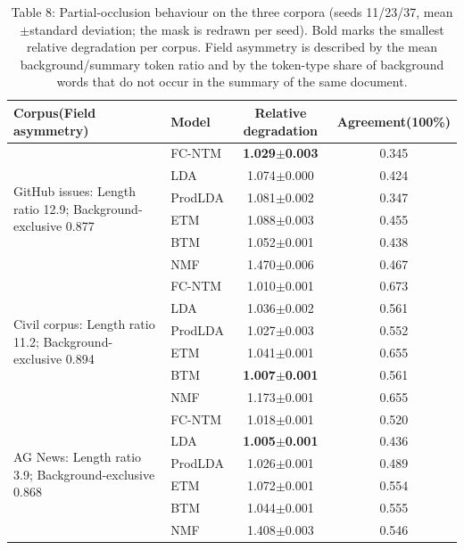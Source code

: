 \documentclass{article}
\begin{document}
\begin{table}[t]
\centering
\caption{Table 8: Partial-occlusion behaviour on the three corpora (seeds 11/23/37, mean$\pm$standard deviation; the mask is redrawn per seed). Bold marks the smallest relative degradation per corpus. Field asymmetry is described by the mean background/summary token ratio and by the token-type share of background words that do not occur in the summary of the same document.}
\label{tab:occl-cross}
\footnotesize
\setlength{\tabcolsep}{3pt}
\begin{tabular}{@{}llcc@{}}
\toprule
Corpus(Field asymmetry) & Model & Relative degradation & Agreement(100\%) \\
\midrule
\multirow{6}{*}{GitHub issues: Length ratio 12.9; Background-exclusive 0.877}
 & FC-NTM & \textbf{1.029$\pm$0.003} & 0.345 \\
 & LDA & 1.074$\pm$0.000 & 0.424 \\
 & ProdLDA & 1.081$\pm$0.002 & 0.347 \\
 & ETM & 1.088$\pm$0.003 & 0.455 \\
 & BTM & 1.052$\pm$0.001 & 0.438 \\
 & NMF & 1.470$\pm$0.006 & 0.467 \\
\midrule
\multirow{6}{*}{Civil corpus: Length ratio 11.2; Background-exclusive 0.894}
 & FC-NTM & 1.010$\pm$0.001 & 0.673 \\
 & LDA & 1.036$\pm$0.002 & 0.561 \\
 & ProdLDA & 1.027$\pm$0.003 & 0.552 \\
 & ETM & 1.041$\pm$0.001 & 0.655 \\
 & BTM & \textbf{1.007$\pm$0.001} & 0.561 \\
 & NMF & 1.173$\pm$0.001 & 0.655 \\
\midrule
\multirow{6}{*}{AG News: Length ratio 3.9; Background-exclusive 0.868}
 & FC-NTM & 1.018$\pm$0.001 & 0.520 \\
 & LDA & \textbf{1.005$\pm$0.001} & 0.436 \\
 & ProdLDA & 1.026$\pm$0.001 & 0.489 \\
 & ETM & 1.072$\pm$0.001 & 0.554 \\
 & BTM & 1.044$\pm$0.001 & 0.555 \\
 & NMF & 1.408$\pm$0.003 & 0.546 \\
\bottomrule
\end{tabular}
\end{table}
\end{document}
